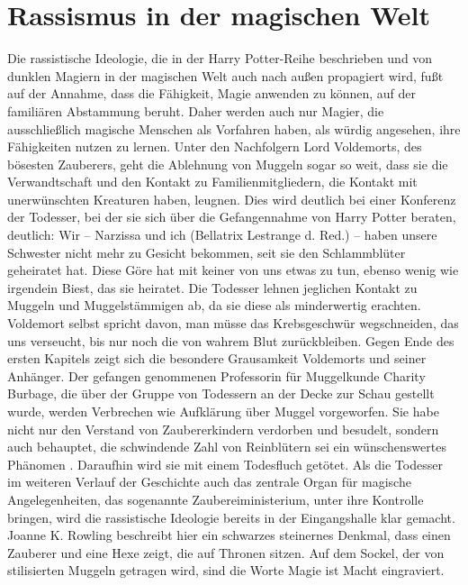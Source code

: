 \section{Rassismus in der magischen Welt}
Die rassistische Ideologie, die in der \glqq Harry Potter\grqq-Reihe beschrieben und von dunklen Magiern in der magischen Welt auch nach außen propagiert wird, fußt auf der Annahme, dass die Fähigkeit, Magie anwenden zu können, auf der familiären Abstammung beruht.
Daher werden auch nur Magier, die ausschließlich magische Menschen als Vorfahren haben, als würdig angesehen, ihre Fähigkeiten nutzen zu lernen.
Unter den Nachfolgern Lord Voldemorts, des bösesten Zauberers, geht die Ablehnung von Muggeln sogar so weit, dass sie die Verwandtschaft und den Kontakt zu Familienmitgliedern, die Kontakt mit \glqq unerwünschten\grqq{} Kreaturen haben, leugnen.
Dies wird deutlich bei einer Konferenz der Todesser, bei der sie sich über die Gefangennahme von Harry Potter beraten, deutlich: \glqq Wir – Narzissa und ich (Bellatrix Lestrange d. Red.) – haben unsere Schwester nicht mehr zu Gesicht bekommen, seit sie den Schlammblüter geheiratet hat. Diese Göre hat mit keiner von uns etwas zu tun, ebenso wenig wie irgendein Biest, das sie heiratet.\grqq{}\cite[S.\,18]{JKR10}
Die Todesser lehnen jeglichen Kontakt zu Muggeln und Muggelstämmigen ab, da sie diese als minderwertig erachten.
Voldemort selbst spricht davon, man müsse \glqq das Krebsgeschwür wegschneiden, das uns verseucht, bis nur noch die von wahrem Blut zurückbleiben.\grqq{}\cite[S.\,19]{JKR10} 
Gegen Ende des ersten Kapitels zeigt sich die besondere Grausamkeit Voldemorts und seiner Anhänger. 
Der gefangen genommenen Professorin für \glqq Muggelkunde\grqq{} Charity Burbage, die über der Gruppe von Todessern an der Decke zur Schau gestellt wurde, werden \glqq Verbrechen\grqq{} wie Aufklärung über Muggel vorgeworfen. 
Sie habe nicht nur \glqq den Verstand von Zaubererkindern\grqq{} verdorben und besudelt, sondern auch behauptet, die schwindende Zahl von Reinblütern sei ein \glqq wünschenswertes Phänomen\grqq{} \cite[S.\,19]{JKR10}. 
Daraufhin wird sie mit einem Todesfluch getötet.
Als die Todesser im weiteren Verlauf der Geschichte auch das zentrale Organ für magische Angelegenheiten, das sogenannte Zaubereiministerium, unter ihre Kontrolle bringen, wird die rassistische Ideologie bereits in der Eingangshalle klar gemacht.
Joanne K. Rowling beschreibt hier ein schwarzes steinernes Denkmal, dass einen Zauberer und eine Hexe zeigt, die auf Thronen sitzen.\cite[S.\,249]{JKR10} 
Auf dem Sockel, der von stilisierten Muggeln getragen wird, sind die Worte \glqq Magie ist Macht\grqq{} eingraviert. 

